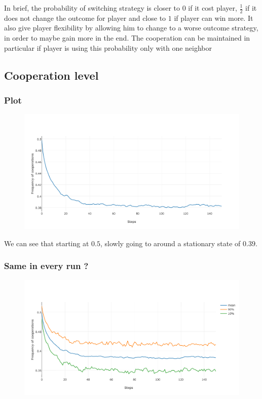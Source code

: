 \documentclass[11pt]{article}
\begin{document}
In brief, the probability of switching strategy is closer to 0 if it cost player, $\frac{1}{2}$ if it does not change the outcome for player and close to $1$ if player can win more. It also give player flexibility by allowing him to change to a worse outcome strategy, in order to maybe gain more in the end. The cooperation can be maintained in particular if player is using this probability only with one neighbor

\subsection{Cooperation level}

\subsubsection{Plot}
 
\begin{figure}[H]
\centering
   \includegraphics[width=\textwidth]{img/part2/part2-moore-notmyself.png}
\end{figure}

We can see that starting at $0.5$, slowly going to around a stationary state of $0.39$.

\subsubsection{Same in every run ?}

\begin{figure}[H]
\centering
   \includegraphics[width=\textwidth]{img/part2/part2-moore-notmyself-std.png}
\end{figure}
\end{document}
